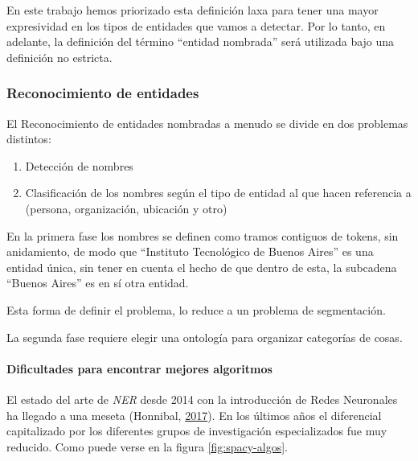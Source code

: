 \documentclass[12pt,a4paper,]{scrartcl}
\providecommand{\tightlist}{%
  \setlength{\itemsep}{0pt}\setlength{\parskip}{0pt}}
\let\oldparagraph\paragraph
\renewcommand{\paragraph}[1]{\oldparagraph{#1}\mbox{}}
\begin{document}
En este trabajo hemos priorizado esta definición laxa para tener una mayor expresividad en los tipos de entidades que vamos a detectar. Por lo tanto, en adelante, la definición del término \enquote{entidad nombrada} será utilizada bajo una definición no estricta.

\hypertarget{reconocimiento-de-entidades}{%
\subsubsection{Reconocimiento de entidades}\label{reconocimiento-de-entidades}}

El Reconocimiento de entidades nombradas a menudo se divide en dos problemas distintos:

\begin{enumerate}
\def\labelenumi{\arabic{enumi}.}
\tightlist
\item
  Detección de nombres
\item
  Clasificación de los nombres según el tipo de entidad al que hacen referencia a (persona, organización, ubicación y otro)
\end{enumerate}

En la primera fase los nombres se definen como tramos contiguos de tokens, sin anidamiento, de modo que \enquote{Instituto Tecnológico de Buenos Aires} es una entidad única, sin tener en cuenta el hecho de que dentro de esta, la subcadena \enquote{Buenos Aires} es en sí otra entidad.

Esta forma de definir el problema, lo reduce a un problema de segmentación.

La segunda fase requiere elegir una ontología para organizar categorías de cosas.

\hypertarget{dificultades-para-encontrar-mejores-algoritmos}{%
\paragraph{Dificultades para encontrar mejores algoritmos}\label{dificultades-para-encontrar-mejores-algoritmos}}

El estado del arte de \emph{NER} desde 2014 con la introducción de Redes Neuronales ha llegado a una meseta (Honnibal, \protect\hyperlink{ref-honnibal_NER}{2017}). En los últimos años el diferencial capitalizado por los diferentes grupos de investigación especializados fue muy reducido. Como puede verse en la figura \ref{fig:spacy-algos}.
\end{document}

